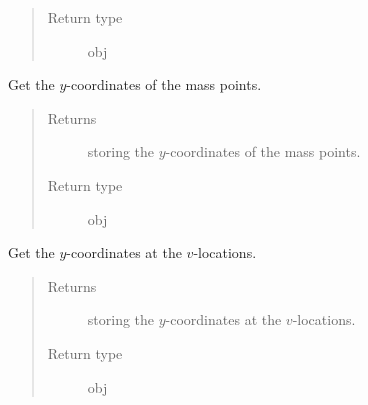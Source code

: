 \documentclass[letterpaper,10pt,english]{sphinxmanual}
\begin{document}
\begin{fulllineitems}
\begin{fulllineitems}
\begin{quote}
\begin{description}
\item[{Return type}] \leavevmode
obj

\end{description}\end{quote}

\end{fulllineitems}


\begin{fulllineitems}
\label{\detokenize{api:tasmania.grids.grid_xyz.GridXYZ.y}}
Get the \(y\)-coordinates of the mass points.
\begin{quote}\begin{description}
\item[{Returns}] \leavevmode
{\hyperref[\detokenize{api:tasmania.grids.axis.Axis}]{}} storing the \(y\)-coordinates of the mass points.

\item[{Return type}] \leavevmode
obj

\end{description}\end{quote}

\end{fulllineitems}


\begin{fulllineitems}
\label{\detokenize{api:tasmania.grids.grid_xyz.GridXYZ.y_at_v_locations}}
Get the \(y\)-coordinates at the \(v\)-locations.
\begin{quote}\begin{description}
\item[{Returns}] \leavevmode
{\hyperref[\detokenize{api:tasmania.grids.axis.Axis}]{}} storing the \(y\)-coordinates at the \(v\)-locations.

\item[{Return type}] \leavevmode
obj

\end{description}\end{quote}

\end{fulllineitems}


\end{fulllineitems}
\end{document}
